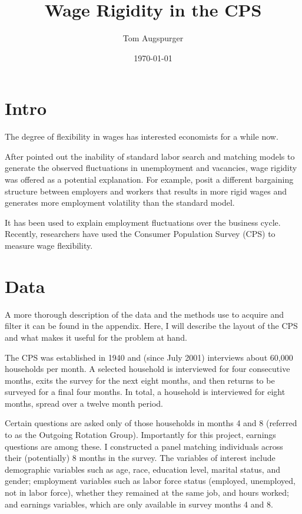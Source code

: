\documentclass[11pt]{article}
\title{Wage Rigidity in the CPS}
\author{Tom Augspurger}
\date{\today}
\begin{document}
\maketitle

\section{Intro}
\label{sec:intro}

The degree of flexibility in wages has interested economists for a while now.

After \cite{shimer_2005} pointed out the inability of standard labor search and matching models to generate the observed fluctuations in unemployment and vacancies, wage rigidity was offered as a potential explanation.
For example, \cite{hall_milgrom_2008} posit a different bargaining structure between employers and workers that results in more rigid wages and generates more employment volatility than the standard model.

It has been used to explain employment fluctuations over the business cycle.
Recently, researchers have used the Consumer Population Survey (CPS) to measure wage flexibility.

\section{Data}
\label{sec:section_name}

A more thorough description of the data and the methods use to acquire and filter it can be found in the appendix.
Here, I will describe the layout of the CPS and what makes it useful for the problem at hand.

The CPS was established in 1940 and (since July 2001) interviews about 60,000 households per month.
A selected household is interviewed for four consecutive months, exits the survey for the next
eight months, and then returns to be surveyed for a final four months.
In total, a household is interviewed for eight months, spread over a twelve month period.

Certain questions are asked only of those households in months 4 and 8 (referred to as the Outgoing Rotation Group).
Importantly for this project, earnings questions are among these.
I constructed a panel matching individuals across their (potentially) 8 months in the survey.
The variables of interest include demographic variables such as age, race, education level, marital status, and gender;
employment variables such as labor force status (employed, unemployed, not in labor force), whether they remained at the same job, and hours worked;
and earnings variables, which are only available in survey months 4 and 8.
\end{document}
